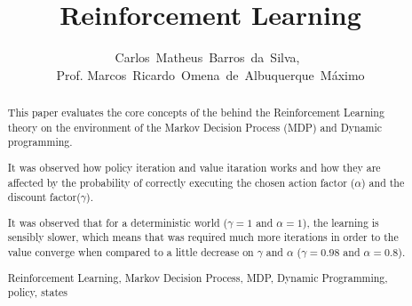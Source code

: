 \documentclass[journal,10pt,onecolumn,draftclsnofoot,]{IEEEtran}
\begin{document}
  \title{Reinforcement Learning}
  \author{Carlos~Matheus~Barros~da~Silva,~
  \\Prof. Marcos~Ricardo~Omena~de~Albuquerque~Máximo}


\maketitle



\begin{abstract}

This paper evaluates the core concepts of the behind the Reinforcement Learning
theory on the environment of the Markov Decision Process (MDP) and Dynamic
programming.

It was observed how policy iteration and value itaration works and how they are
affected by the probability of correctly executing the chosen action factor
($\alpha$) and the discount factor($\gamma$).

It was observed that for a deterministic world ($\gamma = 1$ and $\alpha = 1$),
the learning is sensibly slower, which means that was required much more
iterations in order to the value converge when compared to a little decrease
on $\gamma$ and $\alpha$ ($\gamma = 0.98$ and $\alpha = 0.8$).

\begin{IEEEkeywords}
    Reinforcement Learning, Markov Decision Process, MDP, Dynamic Programming,  policy, states
\end{IEEEkeywords}
\end{abstract}

\IEEEpeerreviewmaketitle
\end{document}
